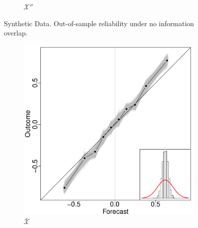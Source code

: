 \documentclass[11pt]{article}
\theoremstyle{definition}
\theoremstyle{definition}
\begin{document}
\begin{figure}[t!]
\begin{subfigure}[b]{0.241\textwidth}
                \caption{$\mathcal{X}''$ }
        \label{RevNoOverlap}
        \end{subfigure}
          \caption{Synthetic Data. Out-of-sample reliability under no information overlap. }
        \label{NOVerlap}
\end{figure}


\begin{figure}[t!]
        \centering
        \begin{subfigure}[b]{0.241\textwidth}
                \includegraphics[width=\textwidth]{SimDepELP.pdf}
                \caption{$\bar{\mathcal{X}}$}
        \label{RelEWAHigh}
        \end{subfigure}%
        ~ %
        \begin{subfigure}[b]{0.241\textwidth}

\end{subfigure}
\end{figure}
\end{document}

